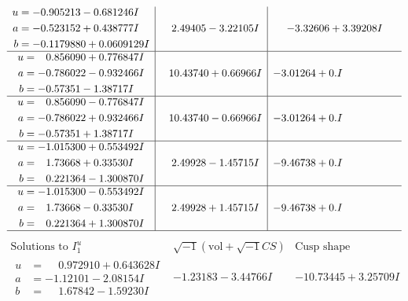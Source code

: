 \documentclass[1p]{elsarticle_modified}
\theoremstyle{definition}
\newcommand{\I}{\sqrt{-1}}
\begin{document}
$$\begin{array}{c|c|c}
\begin{aligned}
u &= -0.905213 - 0.681246 I \\
a &= -0.523152 + 0.438777 I \\
b &= -0.1179880 + 0.0609129 I\end{aligned}
 & \phantom{-}2.49405 - 3.22105 I & -3.32606 + 3.39208 I \\ \hline\begin{aligned}
u &= \phantom{-}0.856090 + 0.776847 I \\
a &= -0.786022 - 0.932466 I \\
b &= -0.57351 - 1.38717 I\end{aligned}
 & \phantom{-}10.43740 + 0.66966 I & -3.01264 + 0. I\phantom{ +0.000000I} \\ \hline\begin{aligned}
u &= \phantom{-}0.856090 - 0.776847 I \\
a &= -0.786022 + 0.932466 I \\
b &= -0.57351 + 1.38717 I\end{aligned}
 & \phantom{-}10.43740 - 0.66966 I & -3.01264 + 0. I\phantom{ +0.000000I} \\ \hline\begin{aligned}
u &= -1.015300 + 0.553492 I \\
a &= \phantom{-}1.73668 + 0.33530 I \\
b &= \phantom{-}0.221364 - 1.300870 I\end{aligned}
 & \phantom{-}2.49928 - 1.45715 I & -9.46738 + 0. I\phantom{ +0.000000I} \\ \hline\begin{aligned}
u &= -1.015300 - 0.553492 I \\
a &= \phantom{-}1.73668 - 0.33530 I \\
b &= \phantom{-}0.221364 + 1.300870 I\end{aligned}
 & \phantom{-}2.49928 + 1.45715 I & -9.46738 + 0. I\phantom{ +0.000000I}\\
 \hline 
 \end{array}$$\newpage$$\begin{array}{c|c|c}  
\text{Solutions to }I^u_{1}& \I (\text{vol} + \sqrt{-1}CS) & \text{Cusp shape}\\
 \hline 
\begin{aligned}
u &= \phantom{-}0.972910 + 0.643628 I \\
a &= -1.12101 - 2.08154 I \\
b &= \phantom{-}1.67842 - 1.59230 I\end{aligned}
 & -1.23183 - 3.44766 I & -10.73445 + 3.25709 I \\ \hline\begin{aligned}

\end{aligned}
\end{array}$$
\end{document}
